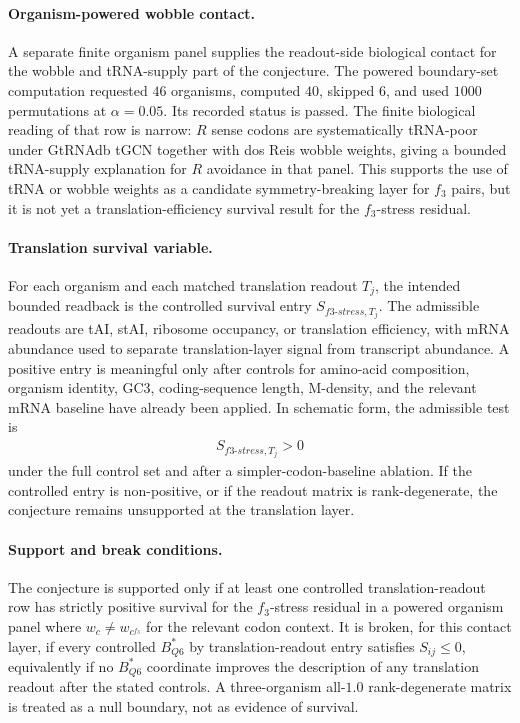 \paragraph{Organism-powered wobble contact.}
A separate finite organism panel supplies the readout-side biological contact for the wobble and tRNA-supply part of the conjecture. The powered boundary-set computation requested $46$ organisms, computed $40$, skipped $6$, and used $1000$ permutations at $\alpha=0.05$. Its recorded status is passed. The finite biological reading of that row is narrow: $R$ sense codons are systematically tRNA-poor under GtRNAdb tGCN together with dos Reis wobble weights, giving a bounded tRNA-supply explanation for $R$ avoidance in that panel. This supports the use of tRNA or wobble weights as a candidate symmetry-breaking layer for $f_3$ pairs, but it is not yet a translation-efficiency survival result for the $f_3$-stress residual.

\paragraph{Translation survival variable.}
For each organism and each matched translation readout $T_j$, the intended bounded readback is the controlled survival entry $S_{f3\text{-}stress,T_j}$. The admissible readouts are tAI, stAI, ribosome occupancy, or translation efficiency, with mRNA abundance used to separate translation-layer signal from transcript abundance. A positive entry is meaningful only after controls for amino-acid composition, organism identity, GC3, coding-sequence length, M-density, and the relevant mRNA baseline have already been applied. In schematic form, the admissible test is
$$\begin{aligned}
S_{f3\text{-}stress,T_j}>0
\end{aligned}$$
under the full control set and after a simpler-codon-baseline ablation. If the controlled entry is non-positive, or if the readout matrix is rank-degenerate, the conjecture remains unsupported at the translation layer.

\paragraph{Support and break conditions.}
The conjecture is supported only if at least one controlled translation-readout row has strictly positive survival for the $f_3$-stress residual in a powered organism panel where $w_c\neq w_{c^{f_3}}$ for the relevant codon context. It is broken, for this contact layer, if every controlled $B^*_{Q6}$ by translation-readout entry satisfies $S_{ij}\leq 0$, equivalently if no $B^*_{Q6}$ coordinate improves the description of any translation readout after the stated controls. A three-organism all-$1.0$ rank-degenerate matrix is treated as a null boundary, not as evidence of survival.

